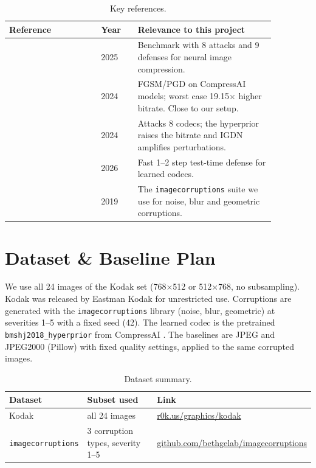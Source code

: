 \documentclass[11pt]{article}
\begin{document}
\begin{table}[h]
\centering
\caption{Key references.}
\label{tab:refs}
\begin{tabular}{@{}p{0.30\linewidth}p{0.12\linewidth}p{0.45\linewidth}@{}}
\toprule
\textbf{Reference} & \textbf{Year} & \textbf{Relevance to this project} \\
\midrule
\citep{bychkov2025nic} & 2025 & Benchmark with 8 attacks and 9 defenses for neural image compression. \\
\citep{zhu2024attack} & 2024 & FGSM/PGD on CompressAI models; worst case 19.15$\times$ higher bitrate. Close to our setup. \\
\citep{wu2024adversarial} & 2024 & Attacks 8 codecs; the hyperprior raises the bitrate and IGDN amplifies perturbations. \\
\citep{liang2026fttr} & 2026 & Fast 1--2 step test-time defense for learned codecs. \\
\citep{michaelis2019benchmarking} & 2019 & The \texttt{imagecorruptions} suite we use for noise, blur and geometric corruptions. \\
\bottomrule
\end{tabular}
\end{table}

\section{Dataset \& Baseline Plan}
\label{sec:data}
We use all 24 images of the Kodak set (768$\times$512 or 512$\times$768, no subsampling). Kodak was released by Eastman Kodak for unrestricted use. Corruptions are generated with the \texttt{imagecorruptions} library (noise, blur, geometric) at severities 1--5 with a fixed seed (42). The learned codec is the pretrained \texttt{bmshj2018\_hyperprior} from CompressAI \citep{balle2018hyperprior,begaint2020compressai}. The baselines are JPEG and JPEG2000 (Pillow) with fixed quality settings, applied to the same corrupted images.

\begin{table}[h]
\centering
\caption{Dataset summary.}
\label{tab:data}
\begin{tabular}{@{}lll@{}}
\toprule
\textbf{Dataset} & \textbf{Subset used} & \textbf{Link} \\
\midrule
Kodak & all 24 images & \href{https://r0k.us/graphics/kodak/}{r0k.us/graphics/kodak} \\
\texttt{imagecorruptions} & 3 corruption types, severity 1--5 & \href{https://github.com/bethgelab/imagecorruptions}{github.com/bethgelab/imagecorruptions} \\
\bottomrule
\end{tabular}
\end{table}
\end{document}
